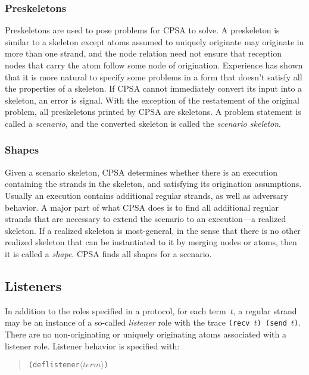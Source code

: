 \documentclass[titlepage,12pt]{article}
\theoremstyle{definition}
\newcommand{\nterm}[1]{\ensuremath{\langle\mathit{#1}\rangle}}
\begin{document}
\subsubsection{Preskeletons}

Preskeletons are used to pose problems for CPSA to solve.  A
preskeleton is similar to a skeleton except atoms assumed to uniquely
originate may originate in more than one strand, and the node relation
need not ensure that reception nodes that carry the atom follow some
node of origination.  Experience has shown that it is more natural to
specify some problems in a form that doesn't satisfy all the
properties of a skeleton.  If CPSA cannot immediately convert its
input into a skeleton, an error is signal.  With the exception of the
restatement of the original problem, all preskeletons printed by CPSA
are skeletons.  A problem statement is called a \emph{scenario}, and
the converted skeleton is called the \emph{scenario skeleton}.

\subsubsection{Shapes}

Given a scenario skeleton, CPSA determines whether there is an execution
containing the strands in the skeleton, and satisfying its
origination assumptions.  Usually an execution contains additional
regular strands, as well as adversary behavior.  A major part of what
CPSA does is to find all additional regular strands that are necessary
to extend the scenario to an execution---a realized skeleton.  If a
realized skeleton is most-general, in the sense that there is no other
realized skeleton that can be instantiated to it by merging nodes or
atoms, then it is called a {\em shape}. CPSA finds all shapes for a
scenario.

\subsection{Listeners}

In addition to the roles specified in a protocol, for each term~$t$, a
regular strand may be an instance of a so-called {\em listener} role
with the trace \texttt{(recv~$t$) (send~$t$)}.  There are no
non-originating or uniquely originating atoms associated with a
listener role.  Listener behavior is specified with:
\begin{quote}
\begin{alltt}
(deflistener \nterm{term})
\end{alltt}
\end{quote}
\end{document}
